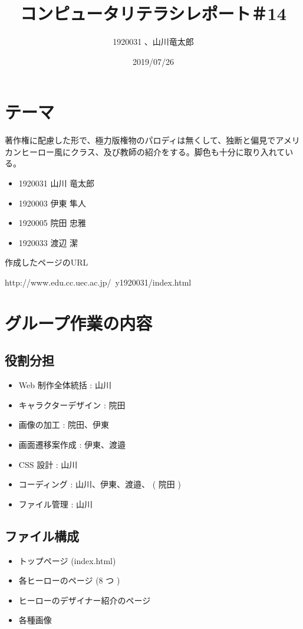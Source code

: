 \documentclass[12pt,a4j]{jarticle}
\begin{document}
\title{コンピュータリテラシレポート＃14}
\author{1920031 、山川竜太郎}
\date{2019/07/26}
\maketitle

\section{テーマ}
著作権に配慮した形で、極力版権物のパロディは無くして、独断と偏見でアメリカンヒーロー風にクラス、及び教師の紹介をする。脚色も十分に取り入れている。

\begin{itemize}
  \item 1920031 山川 竜太郎
  \item 1920003 伊東 隼人
  \item 1920005 院田 忠雅
  \item 1920033 渡辺 潔
\end{itemize}

作成したページのURL

http://www.edu.cc.uec.ac.jp/~y1920031/index.html

\section{グループ作業の内容}
\subsection{役割分担}
\begin{itemize}
  \item Web 制作全体統括 : 山川
  \item キャラクターデザイン : 院田
  \item 画像の加工 : 院田、伊東
  \item 画面遷移案作成 : 伊東、渡邉
  \item CSS 設計 : 山川
  \item コーディング : 山川、伊東、渡邉、 ( 院田 )
  \item ファイル管理 : 山川
\end{itemize}

\subsection{ファイル構成}
\begin{itemize}
  \item トップページ (index.html)
  \item 各ヒーローのページ (8 つ )
  \item ヒーローのデザイナー紹介のページ
  \item 各種画像
\end{itemize}
\end{document}
